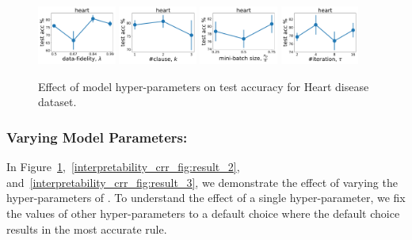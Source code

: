 \begin{figure}[t]
	\centering
	\subfloat
	{\includegraphics[width=0.23\textwidth]{figures/interpretability/relaxed-cnf/heart_test_accuracy_vary_lambda.pdf}\label{interpretability_crr_fig:d}} \hfill
	\subfloat
	{\includegraphics[width=0.23\textwidth]{figures/interpretability/relaxed-cnf/heart_test_accuracy_vary_clause.pdf}\label{interpretability_crr_fig:f}} \hfill
	\subfloat
	{\includegraphics[width=0.23\textwidth]{figures/interpretability/relaxed-cnf/heart_test_accuracy_vary_subsamplesize.pdf}
		\label{interpretability_crr_fig:a}} \hfill
	\subfloat
	{\includegraphics[width=0.23\textwidth]{figures/interpretability/relaxed-cnf/heart_test_accuracy_vary_iteration.pdf}\label{interpretability_crr_fig:g}} \hfill
	\caption[Effect of hyper-parameters on accuracy in {\crr}]{Effect of model hyper-parameters on test accuracy  for  Heart disease dataset. } 
	\label{interpretability_crr_fig:result_1}
\end{figure}
	

	\subsubsection*{Varying Model Parameters: }
	\label{interpretability_crr_sec:model_parameters}
	In Figure~\ref{interpretability_crr_fig:result_1},~\ref{interpretability_crr_fig:result_2}, and~\ref{interpretability_crr_fig:result_3}, we demonstrate the effect of varying the hyper-parameters of {\crr}. To understand the effect of a single hyper-parameter, we fix the values of other hyper-parameters to a default choice where the default choice results in the most accurate rule. 
	 

